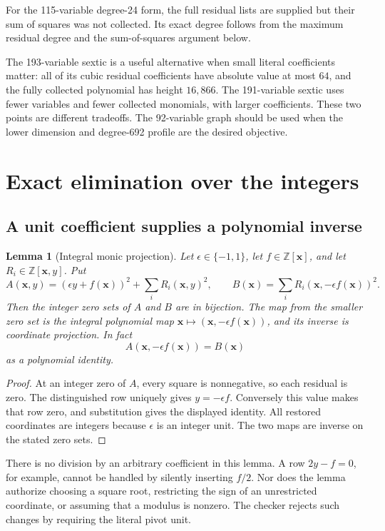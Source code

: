 \documentclass[11pt]{article}
\newtheorem{lemma}[theorem]{Lemma}
\newcommand{\Z}{\mathbb Z}
\begin{document}
For the 115-variable degree-24 form, the full residual lists are supplied
but their sum of squares was not collected. Its exact degree follows
from the maximum residual degree and the sum-of-squares argument below.

The 193-variable sextic is a useful alternative when small literal
coefficients matter: all of its cubic residual coefficients have
absolute value at most $64$, and the fully collected polynomial has
height $16,866$. The 191-variable sextic uses fewer variables and fewer
collected monomials, with larger coefficients. These two points are
different tradeoffs. The 92-variable graph should be used when the
lower dimension and degree-692 profile are the desired objective.

\section{Exact elimination over the integers}\label{sec:elimination}

\subsection{A unit coefficient supplies a polynomial inverse}

\begin{lemma}[Integral monic projection]\label{lem:projection}
Let $\epsilon\in\{-1,1\}$, let $f\in\Z[\boldsymbol x]$, and let
$R_i\in\Z[\boldsymbol x,y]$. Put
\[
 A(\boldsymbol x,y)=(\epsilon y+f(\boldsymbol x))^2+
                    \sum_iR_i(\boldsymbol x,y)^2,
\qquad
 B(\boldsymbol x)=\sum_iR_i(\boldsymbol x,-\epsilon f(\boldsymbol x))^2.
\]
Then the integer zero sets of $A$ and $B$ are in bijection. The map from
the smaller zero set is the integral polynomial map
$\boldsymbol x\mapsto(\boldsymbol x,-\epsilon f(\boldsymbol x))$,
and its inverse is coordinate projection. In fact
\[
 A(\boldsymbol x,-\epsilon f(\boldsymbol x))=B(\boldsymbol x)
\]
as a polynomial identity.
\end{lemma}
\begin{proof}
At an integer zero of $A$, every square is nonnegative, so each residual
is zero. The distinguished row uniquely gives $y=-\epsilon f$.
Conversely this value makes that row zero, and substitution gives the
displayed identity. All restored coordinates are integers because
$\epsilon$ is an integer unit. The two maps are inverse on the stated
zero sets.
\end{proof}

There is no division by an arbitrary coefficient in this lemma. A row
$2y-f=0$, for example, cannot be handled by silently inserting $f/2$.
Nor does the lemma authorize choosing a square root, restricting the
sign of an unrestricted coordinate, or assuming that a modulus is nonzero.
The checker rejects such changes by requiring the literal pivot unit.
\end{document}
